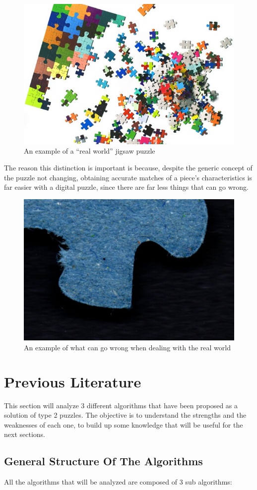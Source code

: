 \documentclass{article}
\begin{document}
\begin{figure}[h]
    \caption{An example of a “real world” jigsaw  puzzle}\label{fig:figure_real_puzzle}
    \includegraphics[height=0.25\textwidth]{pictures/real_puzzle.jpg}
    \centering

\end{figure}

The reason this distinction is important is because,
despite the generic concept of the puzzle not changing,
obtaining accurate matches of a piece's characteristics
is far easier with a digital puzzle,
since there are far less things that can go wrong.


\begin{figure}[h]
    \caption{An example of what can go wrong when dealing with the real world}\label{fig:figure_measurement_error}
    \includegraphics[height=0.25\textwidth]{pictures/example_bad_piece.jpg}
    \centering
\end{figure}

\section{Previous Literature}
This section will analyze 3 different algorithms that have been proposed
as a solution of type 2 puzzles. The objective is to understand the
strengths and the weaknesses of each one, to build up some knowledge
that will be useful for the next sections.

\subsection{General Structure Of The Algorithms}

All the algorithms that will be analyzed are composed of 3 sub algorithms:
\end{document}
